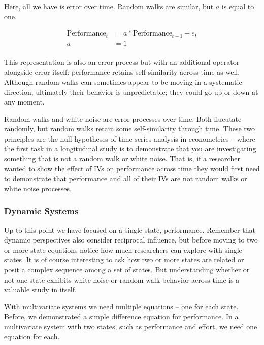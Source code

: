 \documentclass[english,,man]{apa6}
\begin{document}
\noindent Here, all we have is error over time. Random walks are similar, but \(a\) is equal to one.

\begin{equation}
\begin{split}
\label{rw}
\textrm{Performance}_{t} &= a * \textrm{Performance}_{t-1} + e_{t} \\ 
a &= 1 \\ 
\end{split}
\end{equation}

\noindent This representation is also an error process but with an additional operator alongside error itself: performance retains self-similarity across time as well. Although random walks can sometimes appear to be moving in a systematic direction, ultimately their behavior is unpredictable; they could go up or down at any moment.

Random walks and white noise are error processes over time. Both flucutate randomly, but random walks retain some self-similarity through time. These two principles are the null hypotheses of time-series analysis in econometrics -- where the first task in a longitudinal study is to demonstrate that you are investigating something that is not a random walk or white noise. That is, if a researcher wanted to show the effect of IVs on performance across time they would first need to demonstrate that performance and all of their IVs are not random walks or white noise processes.

\hypertarget{dynamic-systems}{%
\subsubsection{Dynamic Systems}\label{dynamic-systems}}

Up to this point we have focused on a single state, performance. Remember that dynamic perspectives also consider reciprocal influence, but before moving to two or more state equations notice how much researchers can explore with single states. It is of course interesting to ask how two or more states are related or posit a complex sequence among a set of states. But understanding whether or not one state exhibits white noise or random walk behavior across time is a valuable study in itself.

With multivariate systems we need multiple equations -- one for each state. Before, we demonstrated a simple difference equation for performance. In a multivariate system with two states, such as performance and effort, we need one equation for each.
\end{document}
